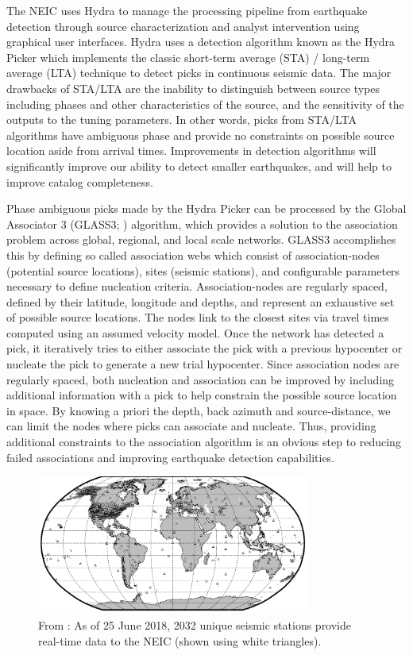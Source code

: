 \documentclass[12p]{article}
\begin{document}
The NEIC uses Hydra \citep{Patton2016} to manage the processing pipeline from earthquake detection through source characterization and analyst intervention using graphical user interfaces. Hydra uses a detection algorithm known as the Hydra Picker which implements the classic short-term average (STA) / long-term average (LTA) \citep{Lee1981} technique to detect picks in continuous seismic data. The major drawbacks of STA/LTA are the inability to distinguish between source types including phases and other characteristics of the source, and the sensitivity of the outputs to the tuning parameters. In other words, picks from STA/LTA algorithms have ambiguous phase and provide no constraints on possible source location aside from arrival times. Improvements in detection algorithms will significantly improve our ability to detect smaller earthquakes, and will help to improve catalog completeness.

Phase ambiguous picks made by the Hydra Picker can be processed by the Global Associator 3 (GLASS3; \citet{Yeck2019}) algorithm, which provides a solution to the association problem across global, regional, and local scale networks. GLASS3 accomplishes this by defining so called association webs which consist of association-nodes (potential source locations), sites (seismic stations), and configurable parameters necessary to define nucleation criteria. Association-nodes are regularly spaced, defined by their latitude, longitude and depths, and represent an exhaustive set of possible source locations. The nodes link to the closest sites via travel times computed using an assumed velocity model. Once the network has detected a pick, it iteratively tries to either associate the pick with a previous hypocenter or nucleate the pick to generate a new trial hypocenter. Since association nodes are regularly spaced, both nucleation and association can be improved by including additional information with a pick to help constrain the possible source location in space. By knowing a priori the depth, back azimuth and source-distance, we can limit the nodes where picks can associate and nucleate. Thus, providing additional constraints to the association algorithm is an obvious step to reducing failed associations and improving earthquake detection capabilities.

\begin{figure}[!htb]
  \center\includegraphics[width=0.8\textwidth]{figures/global_station_coverage.png}
  \caption{\label{fig:stations} From \cite{Yeck2019}: As of 25 June 2018, 2032 unique seismic stations provide real-time data to the NEIC (shown using white triangles).}
\end{figure}
\end{document}
